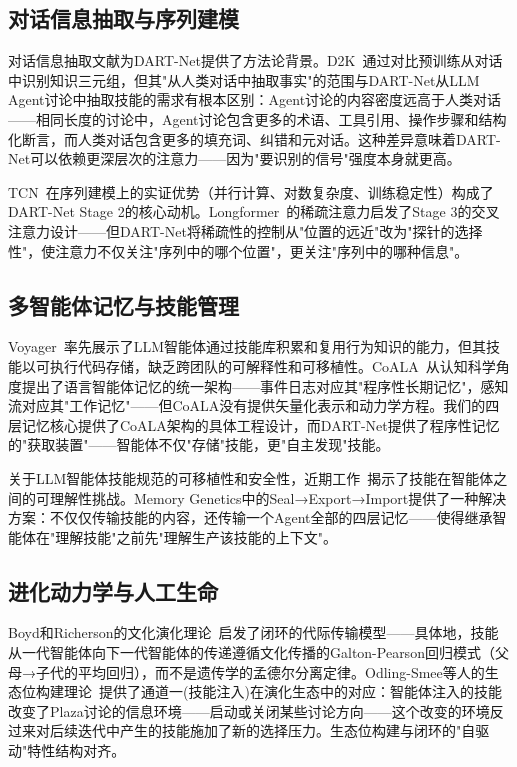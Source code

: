 \documentclass[twocolumn,10.5pt]{ctexart}
\begin{document}
\subsection{对话信息抽取与序列建模}

对话信息抽取文献为DART-Net提供了方法论背景。D2K~\cite{yu2022d2k}通过对比预训练从对话中识别知识三元组，但其"从人类对话中抽取事实"的范围与DART-Net从LLM Agent讨论中抽取技能的需求有根本区别：Agent讨论的内容密度远高于人类对话——相同长度的讨论中，Agent讨论包含更多的术语、工具引用、操作步骤和结构化断言，而人类对话包含更多的填充词、纠错和元对话。这种差异意味着DART-Net可以依赖更深层次的注意力——因为"要识别的信号"强度本身就更高。

TCN~\cite{bai2018tcn}在序列建模上的实证优势（并行计算、对数复杂度、训练稳定性）构成了DART-Net Stage 2的核心动机。Longformer~\cite{beltagy2020longformer}的稀疏注意力启发了Stage 3的交叉注意力设计——但DART-Net将稀疏性的控制从"位置的远近"改为"探针的选择性"，使注意力不仅关注"序列中的哪个位置"，更关注"序列中的哪种信息"。

\subsection{多智能体记忆与技能管理}

Voyager~\cite{wang2023voyager}率先展示了LLM智能体通过技能库积累和复用行为知识的能力，但其技能以可执行代码存储，缺乏跨团队的可解释性和可移植性。CoALA~\cite{sumers2023coala}从认知科学角度提出了语言智能体记忆的统一架构——事件日志对应其"程序性长期记忆"，感知流对应其"工作记忆"——但CoALA没有提供矢量化表示和动力学方程。我们的四层记忆核心提供了CoALA架构的具体工程设计，而DART-Net提供了程序性记忆的"获取装置"——智能体不仅"存储"技能，更"自主发现"技能。

关于LLM智能体技能规范的可移植性和安全性，近期工作~\cite{skill_pseudocode2025,skill_comprehension2025}揭示了技能在智能体之间的可理解性挑战。Memory Genetics中的Seal→Export→Import提供了一种解决方案：不仅仅传输技能的内容，还传输一个Agent全部的四层记忆——使得继承智能体在"理解技能"之前先"理解生产该技能的上下文"。

\subsection{进化动力学与人工生命}

Boyd和Richerson的文化演化理论~\cite{boyd1985culture}启发了闭环的代际传输模型——具体地，技能从一代智能体向下一代智能体的传递遵循文化传播的Galton-Pearson回归模式（父母→子代的平均回归），而不是遗传学的孟德尔分离定律。Odling-Smee等人的生态位构建理论~\cite{odling2003niche}提供了通道一(技能注入)在演化生态中的对应：智能体注入的技能改变了Plaza讨论的信息环境——启动或关闭某些讨论方向——这个改变的环境反过来对后续迭代中产生的技能施加了新的选择压力。生态位构建与闭环的"自驱动"特性结构对齐。
\end{document}

